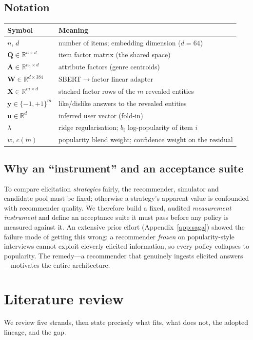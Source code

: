 \documentclass[11pt]{article}
\newcommand{\R}{\mathbb{R}}
\newcommand{\Q}{\mathbf{Q}}
\newcommand{\X}{\mathbf{X}}
\newcommand{\uu}{\mathbf{u}}
\newcommand{\yy}{\mathbf{y}}
\newcommand{\Amat}{\mathbf{A}}
\newcommand{\W}{\mathbf{W}}
\begin{document}
\subsection{Notation}
\begin{table}[h]\centering\small
\begin{tabular}{ll}
\toprule
Symbol & Meaning\\
\midrule
$n,\,d$ & number of items; embedding dimension ($d{=}64$)\\
$\Q\in\R^{n\times d}$ & item factor matrix (the shared space)\\
$\Amat\in\R^{n_a\times d}$ & attribute factors (genre centroids)\\
$\W\in\R^{d\times 384}$ & SBERT$\to$factor linear adapter\\
$\X\in\R^{m\times d}$ & stacked factor rows of the $m$ revealed entities\\
$\yy\in\{-1,+1\}^m$ & like/dislike answers to the revealed entities\\
$\uu\in\R^d$ & inferred user vector (fold-in)\\
$\lambda$ & ridge regularisation; $b_i$ log-popularity of item $i$\\
$w,\,c(m)$ & popularity blend weight; confidence weight on the residual\\
\bottomrule
\end{tabular}
\end{table}

\subsection{Why an ``instrument'' and an acceptance suite}
To compare elicitation \emph{strategies} fairly, the recommender, simulator and candidate pool must be fixed;
otherwise a strategy's apparent value is confounded with recommender quality. We therefore build a fixed, audited
\emph{measurement instrument} and define an acceptance suite it must pass before any policy is measured against
it. An extensive prior effort (Appendix~\ref{app:saga}) showed the failure mode of getting this wrong: a
recommender \emph{frozen} on popularity-style interviews cannot exploit cleverly elicited information, so every
policy collapses to popularity. The remedy---a recommender that genuinely ingests elicited answers---motivates the
entire architecture.

\section{Literature review}\label{sec:lit}
We review five strands, then state precisely what fits, what does not, the adopted lineage, and the gap.
\end{document}
